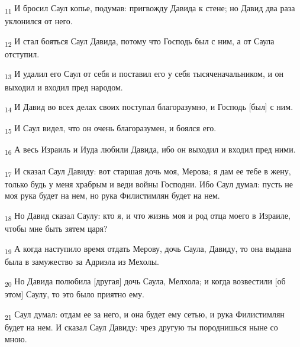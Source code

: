 \begin{tcolorbox}
\textsubscript{11} И бросил Саул копье, подумав: пригвожду Давида к стене; но Давид два раза уклонился от него.
\end{tcolorbox}
\begin{tcolorbox}
\textsubscript{12} И стал бояться Саул Давида, потому что Господь был с ним, а от Саула отступил.
\end{tcolorbox}
\begin{tcolorbox}
\textsubscript{13} И удалил его Саул от себя и поставил его у себя тысяченачальником, и он выходил и входил пред народом.
\end{tcolorbox}
\begin{tcolorbox}
\textsubscript{14} И Давид во всех делах своих поступал благоразумно, и Господь [был] с ним.
\end{tcolorbox}
\begin{tcolorbox}
\textsubscript{15} И Саул видел, что он очень благоразумен, и боялся его.
\end{tcolorbox}
\begin{tcolorbox}
\textsubscript{16} А весь Израиль и Иуда любили Давида, ибо он выходил и входил пред ними.
\end{tcolorbox}
\begin{tcolorbox}
\textsubscript{17} И сказал Саул Давиду: вот старшая дочь моя, Мерова; я дам ее тебе в жену, только будь у меня храбрым и веди войны Господни. Ибо Саул думал: пусть не моя рука будет на нем, но рука Филистимлян будет на нем.
\end{tcolorbox}
\begin{tcolorbox}
\textsubscript{18} Но Давид сказал Саулу: кто я, и что жизнь моя и род отца моего в Израиле, чтобы мне быть зятем царя?
\end{tcolorbox}
\begin{tcolorbox}
\textsubscript{19} А когда наступило время отдать Мерову, дочь Саула, Давиду, то она выдана была в замужество за Адриэла из Мехолы.
\end{tcolorbox}
\begin{tcolorbox}
\textsubscript{20} Но Давида полюбила [другая] дочь Саула, Мелхола; и когда возвестили [об этом] Саулу, то это было приятно ему.
\end{tcolorbox}
\begin{tcolorbox}
\textsubscript{21} Саул думал: отдам ее за него, и она будет ему сетью, и рука Филистимлян будет на нем. И сказал Саул Давиду: чрез другую ты породнишься ныне со мною.
\end{tcolorbox}
